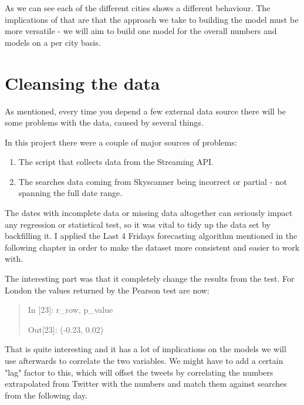 \documentclass[minf,frontabs,twoside,singlespacing,parskip]{infthesis}
\begin{document}
As we can see each of the different cities shows a different behaviour. The implications of that are that the approach we take to building the model must be more versatile - we will aim to build one model for the overall numbers and models on a per city basis.

\section{Cleansing the data}

As mentioned, every time you depend a few external data source there will be some problems with the data, caused by several things. 

In this project there were a couple of major sources of problems:
\begin{enumerate}
\item The script that collects data from the Streaming API.
\item The searches data coming from Skyscanner being incorrect or partial - not spanning the full date range.
\end{enumerate}

The dates with incomplete data or missing data altogether can seriously impact any regression or statistical test, so it was vital to tidy up the data set by backfilling it. I applied the Last 4 Fridays forecasting algorithm mentioned in the following chapter in order to make the dataset more consistent and easier to work with. 

The interesting part was that it completely change the results from the test. For London the values returned by the Pearson test are now:

\begin{quotation}
In [23]: r\_row, p\_value

Out[23]: (-0.23, 0.02)
\end{quotation}

That is quite interesting and it has a lot of implications on the models we will use afterwards to correlate the two variables. 
We might have to add a certain "lag" factor to this, which will offset the tweets by correlating the numbers extrapolated from Twitter with the numbers and match them against searches from the following day.


\end{document}
